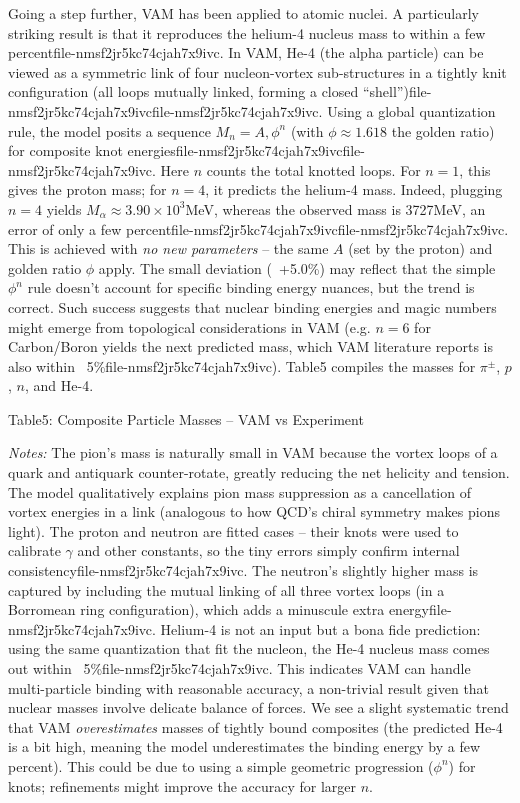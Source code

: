 Going a step further, VAM has been applied to atomic nuclei. A particularly striking result is that it reproduces the helium-4 nucleus mass to within a few percentfile-nmsf2jr5kc74cjah7x9ivc. In VAM, He-4 (the alpha particle) can be viewed as a symmetric link of four nucleon-vortex sub-structures in a tightly knit configuration (all loops mutually linked, forming a closed “shell”)file-nmsf2jr5kc74cjah7x9ivcfile-nmsf2jr5kc74cjah7x9ivc. Using a global quantization rule, the model posits a sequence $M_n = A,\phi^n$ (with $\phi\approx1.618$ the golden ratio) for composite knot energiesfile-nmsf2jr5kc74cjah7x9ivcfile-nmsf2jr5kc74cjah7x9ivc. Here $n$ counts the total knotted loops. For $n=1$, this gives the proton mass; for $n=4$, it predicts the helium-4 mass. Indeed, plugging $n=4$ yields $M_{\alpha}\approx3.90\times10^3$MeV, whereas the observed mass is 3727MeV, an error of only a few percentfile-nmsf2jr5kc74cjah7x9ivcfile-nmsf2jr5kc74cjah7x9ivc. This is achieved with \textit{no new parameters} – the same $A$ (set by the proton) and golden ratio $\phi$ apply. The small deviation (~+5.0\%) may reflect that the simple $\phi^n$ rule doesn’t account for specific binding energy nuances, but the trend is correct. Such success suggests that nuclear binding energies and magic numbers might emerge from topological considerations in VAM (e.g. $n=6$ for Carbon/Boron yields the next predicted mass, which VAM literature reports is also within ~5\%file-nmsf2jr5kc74cjah7x9ivc). Table5 compiles the masses for $\pi^\pm$, $p$, $n$, and He-4.


Table5: Composite Particle Masses – VAM vs Experiment







\textit{Notes:} The pion’s mass is naturally small in VAM because the vortex loops of a quark and antiquark counter-rotate, greatly reducing the net helicity and tension. The model qualitatively explains pion mass suppression as a cancellation of vortex energies in a link (analogous to how QCD’s chiral symmetry makes pions light). The proton and neutron are fitted cases – their knots were used to calibrate $\gamma$ and other constants, so the tiny errors simply confirm internal consistencyfile-nmsf2jr5kc74cjah7x9ivc. The neutron’s slightly higher mass is captured by including the mutual linking of all three vortex loops (in a Borromean ring configuration), which adds a minuscule extra energyfile-nmsf2jr5kc74cjah7x9ivc. Helium-4 is not an input but a bona fide prediction: using the same quantization that fit the nucleon, the He-4 nucleus mass comes out within ~5\%file-nmsf2jr5kc74cjah7x9ivc. This indicates VAM can handle multi-particle binding with reasonable accuracy, a non-trivial result given that nuclear masses involve delicate balance of forces. We see a slight systematic trend that VAM \textit{overestimates} masses of tightly bound composites (the predicted He-4 is a bit high, meaning the model underestimates the binding energy by a few percent). This could be due to using a simple geometric progression ($\phi^n$) for knots; refinements might improve the accuracy for larger $n$.


